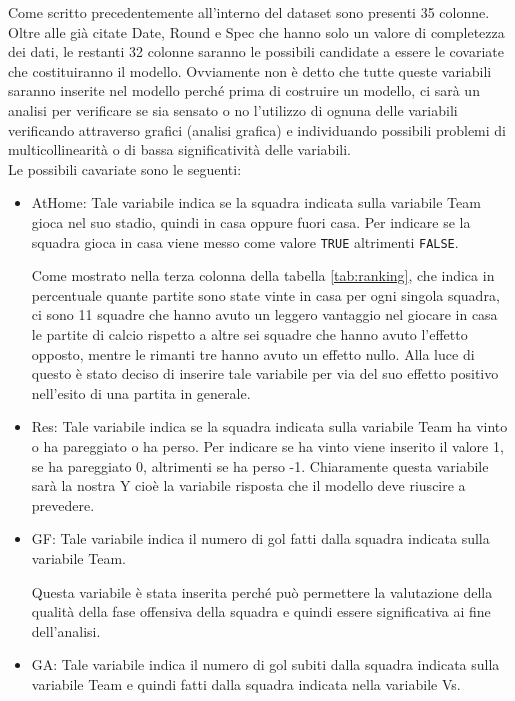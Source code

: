Come scritto precedentemente all'interno del dataset sono presenti 35 colonne. Oltre alle già citate \textsf{Date}, \textsf{Round} e \textsf{Spec} che hanno solo un valore di completezza dei dati, le restanti 32 colonne saranno le possibili candidate a essere le covariate che costituiranno il modello. Ovviamente non è detto che tutte queste variabili saranno inserite nel modello perché prima di costruire un modello, ci sarà un analisi per verificare se sia sensato o no l'utilizzo di ognuna delle variabili verificando attraverso grafici (analisi grafica) e individuando possibili problemi di multicollinearità o di bassa significatività delle variabili.\\ Le possibili cavariate sono le seguenti:
\begin{itemize}
	\item \textsf{AtHome}: Tale variabile indica se la squadra indicata sulla variabile \textsf{Team} gioca nel suo stadio, quindi in casa oppure fuori casa. Per indicare se la squadra gioca in casa viene messo come valore \texttt{TRUE} altrimenti \texttt{FALSE}. 
	
	Come mostrato nella terza colonna della tabella \ref{tab:ranking}, che indica in percentuale quante partite sono state vinte in casa per ogni singola squadra, ci sono 11 squadre che hanno avuto un leggero vantaggio nel giocare in casa le partite di calcio rispetto a altre sei squadre che hanno avuto l'effetto opposto, mentre le rimanti tre hanno avuto un effetto nullo. Alla luce di questo è stato deciso di inserire tale variabile per via del suo effetto positivo nell'esito di una partita in generale.
	\item \textsf{Res}: Tale variabile indica se la squadra indicata sulla variabile \textsf{Team} ha vinto o ha pareggiato o ha perso. Per indicare se ha vinto viene inserito il valore 1, se ha pareggiato 0, altrimenti se ha perso -1. Chiaramente questa variabile sarà la nostra Y cioè la variabile risposta che il modello deve riuscire a prevedere.
	\item \textsf{GF}: Tale variabile indica il numero di gol fatti dalla squadra indicata sulla variabile \textsf{Team}. 
	
	Questa variabile è stata inserita perché può permettere la valutazione della qualità della fase offensiva della squadra e quindi essere significativa ai fine dell'analisi.
	\item \textsf{GA}: Tale variabile indica il numero di gol subiti dalla squadra indicata sulla variabile \textsf{Team} e quindi fatti dalla squadra indicata nella variabile \textsf{Vs}. 
	

\end{itemize}
